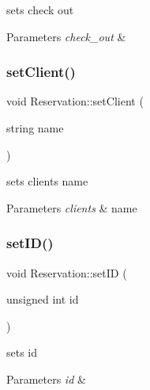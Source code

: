 sets check out 


\begin{DoxyParams}{Parameters}
{\em check\+\_\+out} & \\
\hline
\end{DoxyParams}
\hypertarget{class_reservation_a8a876f7d0a3ac91836499f588a95b6b5}{}\label{class_reservation_a8a876f7d0a3ac91836499f588a95b6b5} 
\subsubsection{\texorpdfstring{set\+Client()}{setClient()}}
{\footnotesize\ttfamily void Reservation\+::set\+Client (\begin{DoxyParamCaption}\item[{string}]{name }\end{DoxyParamCaption})\hspace{0.3cm}{\ttfamily [inline]}}



sets clients name 


\begin{DoxyParams}{Parameters}
{\em clients} & name \\
\hline
\end{DoxyParams}
\hypertarget{class_reservation_a81e0f9725cb37ec2abb9669691ca4440}{}\label{class_reservation_a81e0f9725cb37ec2abb9669691ca4440} 
\subsubsection{\texorpdfstring{set\+I\+D()}{setID()}}
{\footnotesize\ttfamily void Reservation\+::set\+ID (\begin{DoxyParamCaption}\item[{unsigned int}]{id }\end{DoxyParamCaption})\hspace{0.3cm}{\ttfamily [inline]}}



sets id 


\begin{DoxyParams}{Parameters}
{\em id} & \\
\hline
\end{DoxyParams}
\hypertarget{class_reservation_a2ee6742e30cdcba7868ad6189593a3a1}{}\label{class_reservation_a2ee6742e30cdcba7868ad6189593a3a1} 
